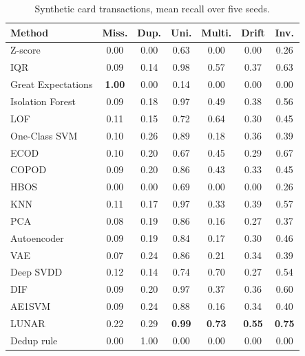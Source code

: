 \documentclass[conference]{IEEEtran}
\begin{document}
\begin{table}[t]
\caption{Synthetic card transactions, mean recall over five seeds.}
\label{tab:m-transactions}
\centering
\footnotesize
\setlength{\tabcolsep}{3pt}
\begin{tabular}{lcccccc}
\toprule
Method & Miss. & Dup. & Uni. & Multi. & Drift & Inv. \\
\midrule
Z-score            & 0.00 & 0.00 & 0.63 & 0.00 & 0.00 & 0.26 \\
IQR                & 0.09 & 0.14 & 0.98 & 0.57 & 0.37 & 0.63 \\
Great Expectations & \textbf{1.00} & 0.00 & 0.14 & 0.00 & 0.00 & 0.00 \\
\midrule
Isolation Forest   & 0.09 & 0.18 & 0.97 & 0.49 & 0.38 & 0.56 \\
LOF                & 0.11 & 0.15 & 0.72 & 0.64 & 0.30 & 0.45 \\
One-Class SVM      & 0.10 & 0.26 & 0.89 & 0.18 & 0.36 & 0.39 \\
ECOD               & 0.10 & 0.20 & 0.67 & 0.45 & 0.29 & 0.67 \\
COPOD              & 0.09 & 0.20 & 0.86 & 0.43 & 0.33 & 0.45 \\
HBOS               & 0.00 & 0.00 & 0.69 & 0.00 & 0.00 & 0.26 \\
KNN                & 0.11 & 0.17 & 0.97 & 0.33 & 0.39 & 0.57 \\
PCA                & 0.08 & 0.19 & 0.86 & 0.16 & 0.27 & 0.37 \\
\midrule
Autoencoder        & 0.09 & 0.19 & 0.84 & 0.17 & 0.30 & 0.46 \\
VAE                & 0.07 & 0.24 & 0.86 & 0.21 & 0.34 & 0.39 \\
Deep SVDD          & 0.12 & 0.14 & 0.74 & 0.70 & 0.27 & 0.54 \\
DIF                & 0.09 & 0.20 & 0.97 & 0.37 & 0.36 & 0.60 \\
AE1SVM             & 0.09 & 0.24 & 0.88 & 0.16 & 0.34 & 0.40 \\
LUNAR              & 0.22 & 0.29 & \textbf{0.99} & \textbf{0.73} & \textbf{0.55} & \textbf{0.75} \\
\midrule
Dedup rule         & 0.00 & 1.00 & 0.00 & 0.00 & 0.00 & 0.00 \\
\bottomrule
\end{tabular}
\end{table}
\end{document}
